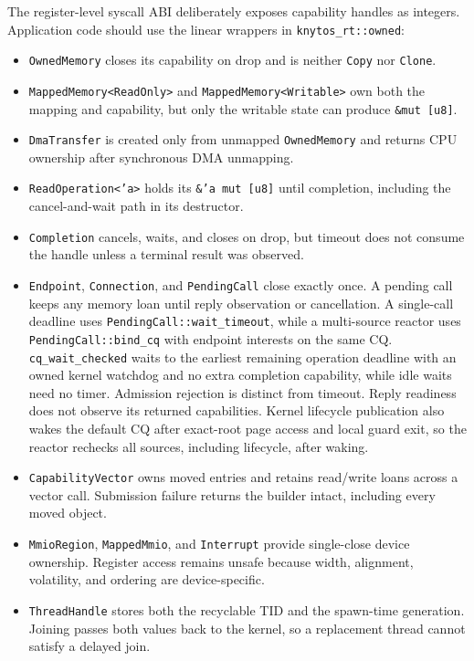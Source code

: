 The register-level syscall ABI deliberately exposes capability handles as
integers. Application code should use the linear wrappers in
\texttt{knytos\_rt::owned}:

\begin{itemize}
    \item \texttt{OwnedMemory} closes its capability on drop and is neither
        \texttt{Copy} nor \texttt{Clone}.
    \item \texttt{MappedMemory<ReadOnly>} and
        \texttt{MappedMemory<Writable>} own both the mapping and capability, but
        only the writable state can produce \texttt{\&mut [u8]}.
    \item \texttt{DmaTransfer} is created only from unmapped
        \texttt{OwnedMemory} and returns CPU ownership after synchronous DMA
        unmapping.
    \item \texttt{ReadOperation<'a>} holds its
        \texttt{\&'a mut [u8]} until completion, including the
        cancel-and-wait path in its destructor.
    \item \texttt{Completion} cancels, waits, and closes on drop, but timeout does
        not consume the handle unless a terminal result was observed.
    \item \texttt{Endpoint}, \texttt{Connection}, and \texttt{PendingCall}
        close exactly once. A pending call keeps any memory loan until reply
        observation or cancellation. A single-call deadline uses
        \texttt{PendingCall::}\allowbreak\texttt{wait\_timeout}, while a multi-source reactor uses
        \texttt{PendingCall::bind\_cq} with endpoint interests on the same CQ.
        \texttt{cq\_wait\_checked} waits to the earliest remaining operation
        deadline with an owned kernel watchdog and no extra completion
        capability, while idle waits need no timer. Admission rejection is distinct
        from timeout. Reply readiness does not observe its
        returned capabilities. Kernel lifecycle publication also wakes the
        default CQ after exact-root page access and local guard exit, so the
        reactor rechecks all sources, including lifecycle, after waking.
    \item \texttt{CapabilityVector} owns moved entries and retains read/write
        loans across a vector call. Submission failure returns the builder
        intact, including every moved object.
    \item \texttt{MmioRegion}, \texttt{MappedMmio}, and \texttt{Interrupt}
        provide single-close device ownership. Register access remains unsafe
        because width, alignment, volatility, and ordering are device-specific.
    \item \texttt{ThreadHandle} stores both the recyclable TID and the
        spawn-time generation. Joining passes both values back to the kernel,
        so a replacement thread cannot satisfy a delayed join.
\end{itemize}

